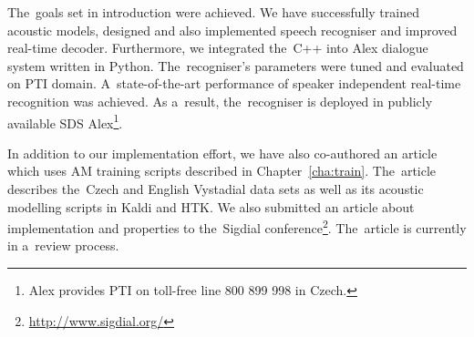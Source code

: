% 
% 
% 

The~goals set in introduction were achieved. 
We have successfully trained acoustic models, designed and also implemented speech recogniser and improved real-time decoder. 
Furthermore, we integrated the~C++  into Alex dialogue system written in Python.
The~recogniser's parameters were tuned and evaluated on \ac{PTI} domain.
A~state-of-the-art performance of speaker independent real-time recognition was achieved. 
As a~result, the~recogniser is deployed in publicly available \acl{SDS} Alex\footnote{Alex provides \acl{PTI} on toll-free line 800 899 998 in Czech.}.

In addition to our implementation effort, we have also co-authored an article which uses \ac{AM} training scripts described in Chapter~\ref{cha:train}.
The~article\cite{korvas_2014} describes the~Czech and English Vystadial data sets as well as its acoustic modelling scripts in Kaldi and \ac{HTK}.
We also submitted an article about  implementation and properties to the~Sigdial conference\footnote{\url{http://www.sigdial.org/}}. The~article is currently in a~review process.

